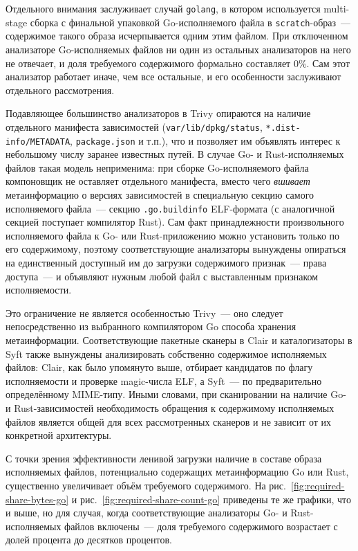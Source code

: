 Отдельного внимания заслуживает случай \texttt{golang}, в котором используется multi-stage сборка с финальной упаковкой Go-исполняемого файла в \texttt{scratch}-образ~--- содержимое такого образа исчерпывается одним этим файлом. При отключенном анализаторе Go-исполняемых файлов ни один из остальных анализаторов на него не отвечает, и доля требуемого содержимого формально составляет 0\%. Сам этот анализатор работает иначе, чем все остальные, и его особенности заслуживают отдельного рассмотрения.

Подавляющее большинство анализаторов в Trivy опираются на наличие отдельного манифеста зависимостей (\texttt{var/lib/dpkg/status}, \texttt{*.dist-info/METADATA}, \texttt{package.json} и т.п.), что и позволяет им объявлять интерес к небольшому числу заранее известных путей. В случае Go- и Rust-исполняемых файлов такая модель неприменима: при сборке Go-исполняемого файла компоновщик не оставляет отдельного манифеста, вместо чего \textit{вшивает} метаинформацию о версиях зависимостей в специальную секцию самого исполняемого файла~--- секцию \texttt{.go.buildinfo} ELF-формата (с аналогичной секцией поступает компилятор Rust). Сам факт принадлежности произвольного исполняемого файла к Go- или Rust-приложению можно установить только по его содержимому, поэтому соответствующие анализаторы вынуждены опираться на единственный доступный им до загрузки содержимого признак~--- права доступа~--- и объявляют нужным любой файл с выставленным признаком исполняемости.

Это ограничение не является особенностью Trivy~--- оно следует непосредственно из выбранного компилятором Go способа хранения метаинформации. Соответствующие пакетные сканеры в Clair и каталогизаторы в Syft также вынуждены анализировать собственно содержимое исполняемых файлов: Clair, как было упомянуто выше, отбирает кандидатов по флагу исполняемости и проверке magic-числа ELF, а Syft~--- по предварительно определённому MIME-типу. Иными словами, при сканировании на наличие Go- и Rust-зависимостей необходимость обращения к содержимому исполняемых файлов является общей для всех рассмотренных сканеров и не зависит от их конкретной архитектуры.

С точки зрения эффективности ленивой загрузки наличие в составе образа исполняемых файлов, потенциально содержащих метаинформацию Go или Rust, существенно увеличивает объём требуемого содержимого. На рис.~\ref{fig:required-share-bytes-go} и рис.~\ref{fig:required-share-count-go} приведены те же графики, что и выше, но для случая, когда соответствующие анализаторы Go- и Rust-исполняемых файлов включены~--- доля требуемого содержимого возрастает с долей процента до десятков процентов.

